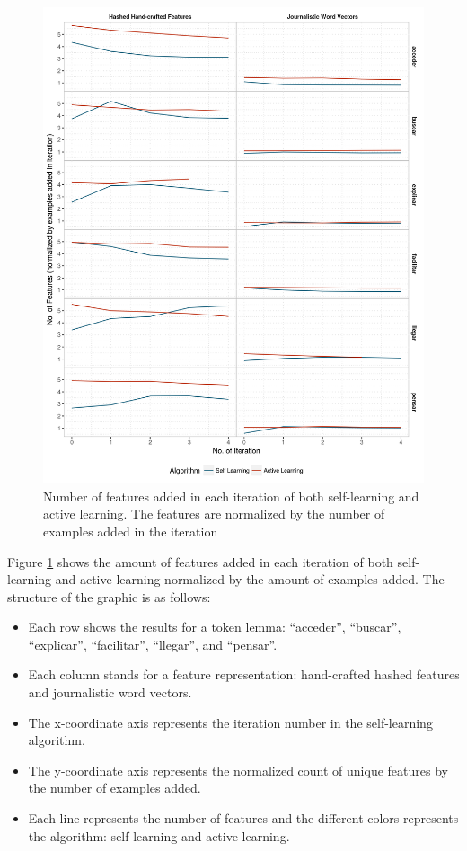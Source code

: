 \begin{figure}[htb!]
  \centering
  \includegraphics[height=0.9\textheight,width=\textwidth,keepaspectratio]
    {plots/active/feature_growth_comparison}
  \caption{Number of features added in each iteration of both self-learning
  and active learning. The features are normalized by the number of examples
  added in the iteration}
  \label{fig:active:feature_growth_comparison}
\end{figure}

Figure \ref{fig:active:feature_growth_comparison} shows the amount of features
added in each iteration of both self-learning and active learning normalized by
the amount of examples added. The structure of the graphic is as follows:

\begin{itemize}
  \item Each row shows the results for a token lemma: ``acceder'', ``buscar'',
    ``explicar'', ``facilitar'', ``llegar'', and ``pensar''.
  \item Each column stands for a feature representation: hand-crafted hashed
    features and journalistic word vectors.
  \item The x-coordinate axis represents the iteration number in the
    self-learning algorithm.
  \item The y-coordinate axis represents the normalized count of unique
    features by the number of examples added.
  \item Each line represents the number of features and the different colors
    represents the algorithm: self-learning and active learning.
\end{itemize}

